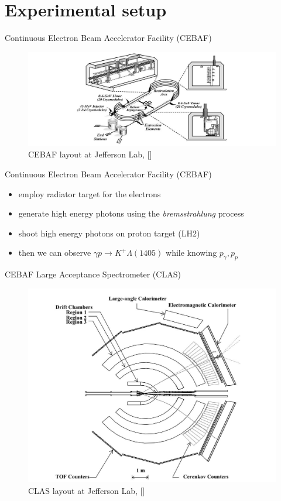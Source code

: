 \documentclass[11pt,aspectratio=1610,dvipsnames]{beamer}
\begin{document}
\section{Experimental setup}
\begin{frame}{Continuous Electron Beam Accelerator Facility (CEBAF)}
	\begin{figure}
		\centering
		\includegraphics[width=\linewidth]{setup_big.jpg}
		\caption{CEBAF layout at Jefferson Lab, [\cite{clas}]}
	\end{figure}
\end{frame}

\begin{frame}{Continuous Electron Beam Accelerator Facility (CEBAF)}
		\begin{tcolorbox}[colback=black!10,colframe=gray!20!black,title=How can we access $\Lambda(1405)$ with this setup?]
			\begin{itemize}
				\item employ radiator target for the electrons
				\item generate high energy photons using the \emph{bremsstrahlung} process
				\item shoot high energy photons on proton target (LH2)
				\item then we can observe $\gamma p \to K^+\Lambda(1405)$ while knowing $p_\gamma,p_p$
			\end{itemize} 
			
		\end{tcolorbox}
\end{frame}

\begin{frame}{CEBAF Large Acceptance Spectrometer (CLAS)}
	\begin{figure}
		\centering
		\includegraphics[width=.7\linewidth]{setup.jpg}
		\caption{CLAS layout at Jefferson Lab, [\cite{clas}]}
	\end{figure}
\end{frame}
\end{document}
